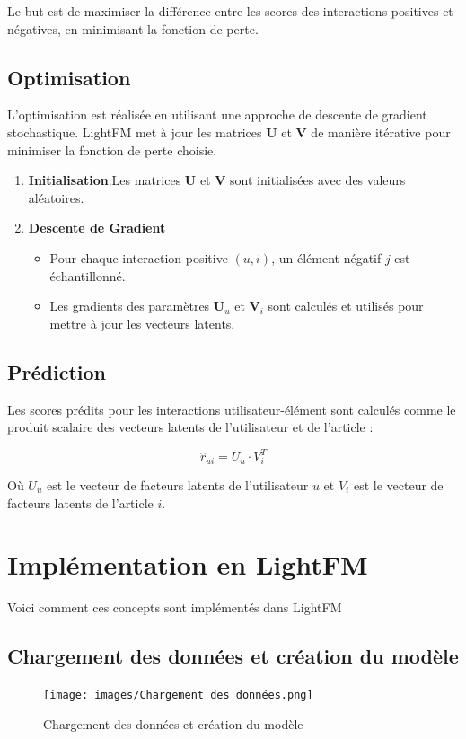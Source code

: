 \documentclass[edit,12pt,a4paper,ChapStyle,oneside,doubleinterligne]{report}
\begin{document}
Le but est de maximiser la différence entre les scores des interactions positives et négatives, en minimisant la fonction de perte.
\subsection{Optimisation}
L'optimisation est réalisée en utilisant une approche de descente de gradient stochastique. LightFM met à jour les matrices \( \mathbf{U} \) et \( \mathbf{V} \) de manière itérative pour minimiser la fonction de perte choisie.

\begin{enumerate}
    \item \textbf{Initialisation}:Les matrices \( \mathbf{U} \) et \( \mathbf{V} \) sont initialisées avec des valeurs aléatoires.
    \item \textbf{Descente de Gradient}
    \begin{itemize}
        \item Pour chaque interaction positive \( (u, i) \), un élément négatif \( j \) est échantillonné.
        \item Les gradients des paramètres \( \mathbf{U}_u \) et \( \mathbf{V}_i \) sont calculés et utilisés pour mettre à jour les vecteurs latents.
    \end{itemize}
\end{enumerate}
\subsection{Prédiction}
Les scores prédits pour les interactions utilisateur-élément sont calculés comme le produit scalaire des vecteurs latents de l'utilisateur et de l'article :

\[
\hat{r}_{ui} = U_u \cdot V_i^T
\]

Où \(U_u\) est le vecteur de facteurs latents de l'utilisateur \(u\) et \(V_i\) est le vecteur de facteurs latents de l'article \(i\).

\section{Implémentation en LightFM}
Voici comment ces concepts sont implémentés dans LightFM
\subsection{Chargement des données et création du modèle}
\begin{figure} [H]
    \centering
    \texttt{[image: images/Chargement des données.png]}
    \caption{Chargement des données et création du modèle}
    \label{fig:cdd}
\end{figure}
\end{document}
